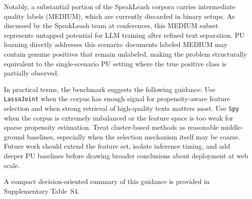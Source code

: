 \documentclass[applsci,article,accept,pdftex,moreauthors]{Definitions/mdpi}
\newcommand{\rev}[1]{{#1}}
\begin{document}
Notably, a substantial portion of the SpeakLeash corpora carries intermediate quality labels (MEDIUM), which are currently discarded in binary setups. As discussed by the SpeakLeash team at conferences, this MEDIUM subset represents untapped potential for LLM training after refined text separation. PU learning directly addresses this scenario: documents labeled MEDIUM may contain genuine positives that remain unlabeled, making the problem structurally equivalent to the single-scenario PU setting where the true positive class is partially observed.

\rev{In practical terms, the benchmark suggests the following guidance: Use \texttt{LassoJoint} when the corpus has enough signal for propensity-aware feature selection and when strong retrieval of high-quality texts matters most. Use \texttt{Spy} when the corpus is extremely imbalanced or the feature space is too weak for sparse propensity estimation. Treat cluster-based methods as reasonable middle-ground baselines, especially when the selection mechanism itself may be coarse. Future work should extend the feature set, isolate inference timing, and add deeper PU baselines before drawing broader conclusions about deployment at web scale.}

\rev{A compact decision-oriented summary of this guidance is provided in Supplementary Table~S4.}


\vspace{6pt}

\end{document}
